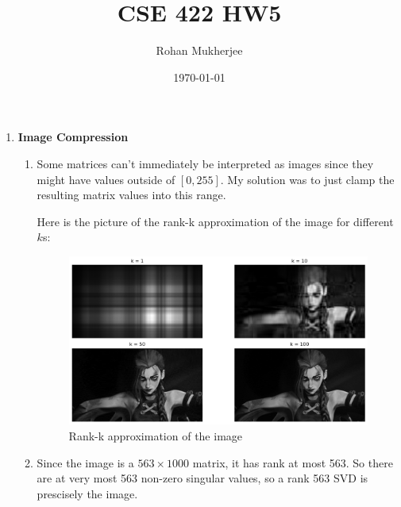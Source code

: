 \documentclass[12pt]{article}
\title{CSE 422 HW5}
\date{\today}
\author{Rohan Mukherjee}
\theoremstyle{definitionstyle}
\begin{document}
    \maketitle
    \begin{enumerate}[leftmargin=\labelsep]
        \item \textbf{Image Compression}
        \begin{enumerate}[label=\textbf{(\alph*)}]
            \item Some matrices can't immediately be interpreted as images since they might have values outside of $[0,255]$. My solution was to just clamp the resulting matrix values into this range.
            
            Here is the picture of the rank-k approximation of the image for different $k$s:
            \begin{figure}[H]
                \centering
                \includegraphics[width=\textwidth]{rank_k_approx.png}
                \caption{Rank-k approximation of the image}
            \end{figure}
    
            \item Since the image is a $563\times 1000$ matrix, it has rank at most 563. So there are at very most 563 non-zero singular values, so a rank 563 SVD is prescisely the image.
    

\end{enumerate}
\end{enumerate}
\end{document}
